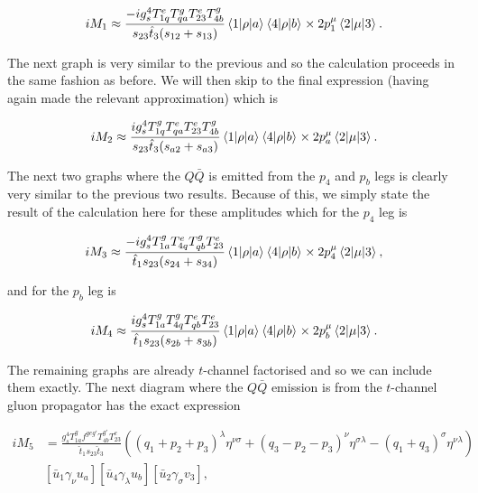\begin{equation}
iM_1 \approx  \frac{- i g_s^4 T^e_{1q}T^g_{qa}T^e_{23}T^g_{4b}}{s_{23} \hat{t}_3 (s_{12} + s_{13})} \mathinner{\langle1\vert\rho\vert a\rangle}_{} \mathinner{\langle4\vert\rho\vert b\rangle}_{} \times 2p_1^\mu \mathinner{\langle2\vert\mu\vert3\rangle}_{}.
\end{equation} 

The next graph is very similar to the previous and so the calculation proceeds in the same fashion as before. We will then skip to the final expression (having again made the relevant approximation) which is

\begin{equation}
iM_2 \approx \frac{ i g_s^4 T^g_{1q}T^e_{qa}T^e_{23}T^g_{4b}}{s_{23} \hat{t}_3 (s_{a2}+s_{a3})} \mathinner{\langle1\vert\rho\vert a\rangle}_{} \mathinner{\langle4\vert\rho\vert b\rangle}_{}\times 2p_a^\mu \mathinner{\langle2\vert\mu\vert3\rangle}_{}.
\end{equation}    

The next two graphs where the $Q \bar{Q}$ is emitted from the $p_4$ and $p_b$ legs is clearly very similar to the previous two results. Because of this, we simply state the result of the calculation here for these amplitudes which for the $p_4$ leg is

\begin{equation}
iM_3 \approx \frac{-i g_s^4 T^g_{1a} T^e_{4q}T^g_{qb}T^e_{23}}{\hat{t}_1 s_{23}(s_{24}+s_{34})}\mathinner{\langle1\vert\rho\vert a\rangle}_{} \mathinner{\langle4\vert\rho\vert b\rangle}_{} \times 2 p_4^\mu \mathinner{\langle2\vert\mu\vert3\rangle}_{},
\end{equation}

and for the $p_b$ leg is

\begin{equation}
iM_4 \approx \frac{i g_s^4 T^g_{1a} T^g_{4q} T^e_{qb} T^e_{23}}{\hat{t}_1 s_{23}(s_{2b}+s_{3b})} \mathinner{\langle1\vert\rho\vert a\rangle}_{} \mathinner{\langle4\vert\rho\vert b\rangle}_{} \times 2 p_b^\mu \mathinner{\langle2\vert\mu\vert3\rangle}_{}.
\end{equation}

The remaining graphs are already $t$-channel factorised and so we can include them exactly. The next diagram where the $Q \bar{Q}$ emission is from the $t$-channel gluon propagator has the exact expression

\begin{equation}
\begin{split}
iM_5 &= \frac{g_s^4 T^g_{1a} f^{geg'}T^{g'}_{4b}T^e_{23}}{\hat{t}_1 s_{23} \hat{t}_3} \left((q_1 + p_2 + p_3)^\lambda \eta^{\nu \sigma} + (q_3 - p_2 -p_3)^\nu \eta^{\sigma \lambda} - (q_1 + q_3)^\sigma \eta^{\nu \lambda} \right) \\
& \left[\bar{u}_1 \gamma_\nu u_a \right]  \left[\bar{u}_4 \gamma_\lambda u_b \right] \left[\bar{u}_2 \gamma_\sigma v_3 \right],
\end{split}
\end{equation}

